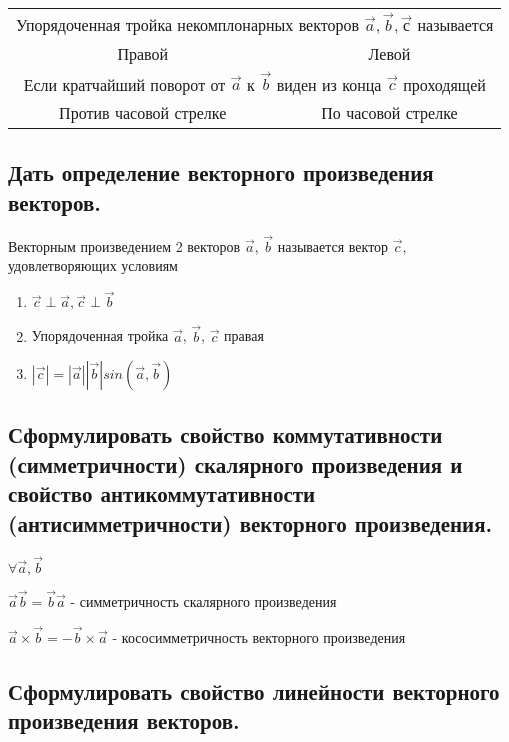 \documentclass[a4paper, 10pt]{article}
\newcommand{\mcol}[1]{\multicolumn{2}{c}{#1}}
\begin{document}
\begin{center}
\begin{tabular}{c c} 

    \mcol{Упорядоченная тройка некомплонарных векторов $\vec{a}, \vec{b}, \vec{с}$ называется }\\
    Правой & Левой \\
    \mcol{Если кратчайший поворот от $\vec{a}$ к $\vec{b}$ виден из конца $\vec{c}$ проходящей}\\
    Против часовой стрелке & По часовой стрелке\\

\end{tabular}
\end{center}

\subsection{Дать определение векторного произведения векторов.}

Векторным произведением 2 векторов $\vec{a}$, $\vec{b}$ называется вектор $\vec{c}$, удовлетворяющих условиям
\begin{enumerate}
    \item $\vec{c} \perp \vec{a}, \vec{c} \perp \vec{b}$
    \item Упорядоченная тройка $\vec{a}$, $\vec{b}$, $\vec{c}$ правая
    \item $|\vec{c}| = |\vec{a}||\vec{b}|sin(\vec{a}, \vec{b})$
\end{enumerate}

\subsection{Сформулировать свойство коммутативности (симметричности) скалярного произведения 
и свойство антикоммутативности (антисимметричности) векторного произведения.}

\begin{center}
$\forall \vec{a}, \vec{b}$

$\vec{a}\vec{b} = \vec{b}\vec{a}$ - симметричность скалярного произведения

$\vec{a} \times \vec{b} = - \vec{b} \times \vec{a}$ - кососимметричность векторного произведения
\end{center}

\subsection{Сформулировать свойство линейности векторного произведения векторов.}
\end{document}
